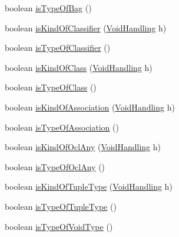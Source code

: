 \begin{DoxyCompactItemize}
\item 
boolean \hyperlink{classorg_1_1tzi_1_1use_1_1uml_1_1mm_1_1_m_classifier_impl_aea366ce4f709f0dacc78c94be5731270}{is\-Type\-Of\-Bag} ()
\item 
boolean \hyperlink{classorg_1_1tzi_1_1use_1_1uml_1_1mm_1_1_m_classifier_impl_ac2982b61e05752b74a8e9f7833c27390}{is\-Kind\-Of\-Classifier} (\hyperlink{enumorg_1_1tzi_1_1use_1_1uml_1_1ocl_1_1type_1_1_type_1_1_void_handling}{Void\-Handling} h)
\item 
boolean \hyperlink{classorg_1_1tzi_1_1use_1_1uml_1_1mm_1_1_m_classifier_impl_afded5b3baec72bc0175d751bd637f7a3}{is\-Type\-Of\-Classifier} ()
\item 
boolean \hyperlink{classorg_1_1tzi_1_1use_1_1uml_1_1mm_1_1_m_classifier_impl_af69494cdeb7fa095ee74e40081db8b84}{is\-Kind\-Of\-Class} (\hyperlink{enumorg_1_1tzi_1_1use_1_1uml_1_1ocl_1_1type_1_1_type_1_1_void_handling}{Void\-Handling} h)
\item 
boolean \hyperlink{classorg_1_1tzi_1_1use_1_1uml_1_1mm_1_1_m_classifier_impl_ab2480ff2ec205c50d5a2a5af90b498c6}{is\-Type\-Of\-Class} ()
\item 
boolean \hyperlink{classorg_1_1tzi_1_1use_1_1uml_1_1mm_1_1_m_classifier_impl_aac0e272f156595e7339b809ee22e81b4}{is\-Kind\-Of\-Association} (\hyperlink{enumorg_1_1tzi_1_1use_1_1uml_1_1ocl_1_1type_1_1_type_1_1_void_handling}{Void\-Handling} h)
\item 
boolean \hyperlink{classorg_1_1tzi_1_1use_1_1uml_1_1mm_1_1_m_classifier_impl_acb4a2b5afd380bc3f0c41303b19abad6}{is\-Type\-Of\-Association} ()
\item 
boolean \hyperlink{classorg_1_1tzi_1_1use_1_1uml_1_1mm_1_1_m_classifier_impl_aa143a2757651d91e23ac53f7039b95ae}{is\-Kind\-Of\-Ocl\-Any} (\hyperlink{enumorg_1_1tzi_1_1use_1_1uml_1_1ocl_1_1type_1_1_type_1_1_void_handling}{Void\-Handling} h)
\item 
boolean \hyperlink{classorg_1_1tzi_1_1use_1_1uml_1_1mm_1_1_m_classifier_impl_a44b23abc29a1cb5b1aaeeb68eedaf31d}{is\-Type\-Of\-Ocl\-Any} ()
\item 
boolean \hyperlink{classorg_1_1tzi_1_1use_1_1uml_1_1mm_1_1_m_classifier_impl_ad7d0b4d3ab8e7d812c9a8e42c265c21d}{is\-Kind\-Of\-Tuple\-Type} (\hyperlink{enumorg_1_1tzi_1_1use_1_1uml_1_1ocl_1_1type_1_1_type_1_1_void_handling}{Void\-Handling} h)
\item 
boolean \hyperlink{classorg_1_1tzi_1_1use_1_1uml_1_1mm_1_1_m_classifier_impl_ad5e2ebd006ca872c7ed20bc224f8ee48}{is\-Type\-Of\-Tuple\-Type} ()
\item 
boolean \hyperlink{classorg_1_1tzi_1_1use_1_1uml_1_1mm_1_1_m_classifier_impl_a2184bd680dde00eb4c7617234ce3146a}{is\-Type\-Of\-Void\-Type} ()

\end{DoxyCompactItemize}
